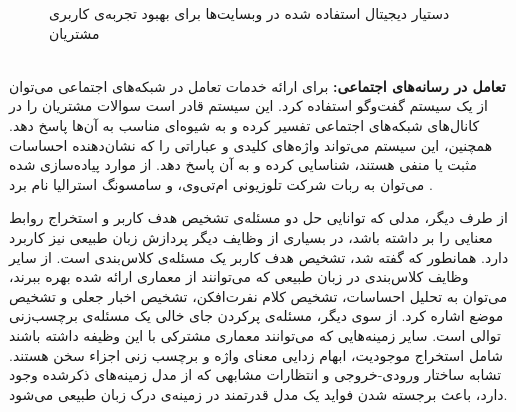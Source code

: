 \begin{figure}[!htb]
	\caption{
		دستیار دیجیتال استفاده شده در وبسایت‌ها برای بهبود تجربه‌ی کاربری مشتریان
	}
	\label{Fig:DialoguesystemExamples}
\end{figure}
\\
\textbf{ تعامل در رسانه‌های اجتماعی:}
برای ارائه خدمات تعامل در شبکه‌های اجتماعی می‌توان از یک سیستم گفت‌وگو استفاده کرد. این سیستم قادر است سوالات مشتریان را در کانال‌های شبکه‌های اجتماعی تفسیر کرده و به شیوه‌ای مناسب به آن‌ها پاسخ دهد. همچنین، این سیستم می‌تواند واژه‌های کلیدی و عباراتی را که نشان‌دهنده احساسات مثبت یا منفی هستند، شناسایی کرده و به آن پاسخ دهد. از موارد پیاده‌سازی شده می‌توان به ربات شرکت تلوزیونی ام‌تی‌وی، و سامسونگ استرالیا نام برد \cite{socialchatbot}.

از طرف دیگر، مدلی که توانایی حل دو مسئله‌ی تشخیص هدف کاربر و استخراج روابط معنایی را بر داشته باشد، در بسیاری از وظایف دیگر پردازش زبان طبیعی نیز کاربرد دارد. همانطور که گفته شد، تشخیص هدف کاربر یک مسئله‌ی کلاس‌بندی است. از سایر وظایف کلاس‌بندی در زبان طبیعی که می‌توانند از معماری ارائه شده بهره ببرند، می‌توان به تحلیل احساسات، تشخیص کلام نفرت‌افکن، تشخیص اخبار جعلی و تشخیص موضع اشاره کرد. از سوی دیگر، مسئله‌ی پرکردن جای خالی یک مسئله‌ی برچسب‌زنی توالی است. سایر زمینه‌هایی که می‌توانند معماری مشترکی با این وظیفه داشته باشند شامل استخراج موجودیت، ابهام زدایی معنای واژه و برچسب زنی اجزاء سخن هستند. تشابه ساختار ورودی-خروجی و انتظارات مشابهی که از مدل زمینه‌های ذکرشده وجود دارد، باعث برجسته شدن فواید یک مدل قدرتمند در زمینه‌ی درک زبان طبیعی می‌شود.
